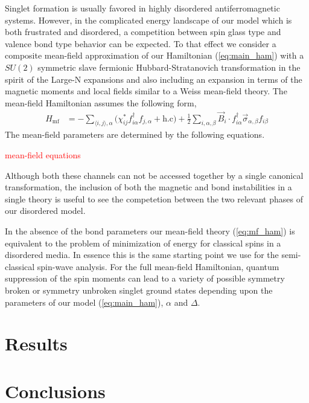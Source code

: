 \documentclass[aps,prb,twocolumn,showpacs]{revtex4-1}
\newcommand{\rcol}{\textcolor{red}}
\newcommand{\beq}{\begin{equation}}
\newcommand{\eeq}{\end{equation}}
\newcommand{\bal}{\begin{aligned}}
\newcommand{\eal}{\end{aligned}}
\begin{document}
Singlet formation is usually favored in highly disordered antiferromagnetic
systems\cite{Bhatt-disordered-afm-1982,Zhou-disordered-afm-2009}. However,
in the complicated energy landscape of our model which is both frustrated and
disordered, a competition between spin glass type and valence bond type 
behavior can be expected. To that effect we consider a composite mean-field
approximation of our Hamiltonian (\ref{eq:main_ham}) with 
a $SU(2)$ symmetric slave fermionic Hubbard-Stratanovich transformation in the 
spirit of the Large-N expansions\cite{Affleck-large-N-1988,
Zhou-disordered-afm-2009} and also including an expansion in terms of the 
magnetic moments and local fields similar to a Weiss mean-field 
theory. The mean-field Hamiltonian assumes the following form,
\beq\label{eq:mf_ham}
    \bal
        H_{\text{mf}} &= 
    -\sum_{\langle i,j\rangle,\alpha}\Big(\chi^*_{ij}
    f^\dagger_{i\alpha}f_{j,\alpha}+\text{h.c}\Big)
    +\frac{1}{2}\sum_{i,\alpha,\beta}\vec{B}_i\cdot
    f^\dagger_{i\alpha}\vec{\sigma}_{\alpha,\beta}f_{i\beta}
    \eal
\eeq
The mean-field parameters are determined by the following equations.

\rcol{mean-field equations}

Although both these channels can not be accessed together by a single canonical 
transformation, the inclusion of both the magnetic and bond instabilities in a 
single theory is useful to see the competetion between the two relevant phases 
of our disordered model. 

In the absence of the bond parameters our mean-field theory (\ref{eq:mf_ham}) is 
equivalent to the problem of minimization of energy for classical spins in a 
disordered media. In essence this is the same starting point we use for the 
semi-classical spin-wave analysis. For the full mean-field Hamiltonian,
quantum suppression of the spin moments can lead to a variety of possible 
symmetry broken or symmetry unbroken singlet ground states depending upon the 
parameters of our model (\ref{eq:main_ham}), $\alpha$ and $\Delta$.

\section{Results}

\section{Conclusions}


\end{document}
